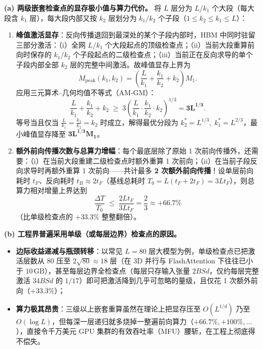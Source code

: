 \textbf{(a) 两级嵌套检查点的显存极小值与算力代价。} 将 $L$ 层分为 $L / k_1$ 个大段（每大段含 $k_1$ 层），每大段内部又按 $k_2$ 层划分为 $k_1 / k_2$ 个子段（$1 \le k_2 \le k_1 \le L$）：
\begin{enumerate}
  \item \textbf{峰值激活显存}：反向传播退回到最深处的某个子段内部时，HBM 中同时驻留三部分激活：（i）全网 $L / k_1$ 个大段起点的顶级检查点；（ii）当前大段重算前向时保存的 $k_1 / k_2$ 个子段起点的二级检查点；（iii）当前正在反向求导的单个子段内部全部 $k_2$ 层的完整中间激活。故峰值显存上界为
  \[
    M_{\mathrm{peak}}(k_1, k_2) = \left(\frac{L}{k_1} + \frac{k_1}{k_2} + k_2\right) M_1.
  \]
  应用三元算术--几何均值不等式（AM-GM）：
  \[
    \frac{L}{k_1} + \frac{k_1}{k_2} + k_2 \;\ge\; 3\left(\frac{L}{k_1} \cdot \frac{k_1}{k_2} \cdot k_2\right)^{1/3} = \mathbf{3 L^{1/3}}.
  \]
  等号当且仅当 $\frac{L}{k_1} = \frac{k_1}{k_2} = k_2$ 时成立，解得最优分段为 $k_2^* = L^{1/3},\; k_1^* = L^{2/3}$，最小峰值显存降至 $\mathbf{3 L^{1/3} M_1}$。
  \item \textbf{额外前向传播次数与总算力增幅}：每个最底层除了原始 1 次前向传播外，还需要：（i）在当前大段重建二级检查点时额外重算 1 次前向；（ii）在当前子段反向求导时再额外重算 1 次前向——共计最多 \textbf{2 次额外前向传播}！设单层前向耗时 $t_F$、反向耗时 $t_B \approx 2 t_F$（基线总耗时 $T_0 = L(t_F + 2 t_F) = 3 L t_F$），则总算力相对增量上界达到
  \[
    \frac{\Delta T}{T_0} \;\le\; \frac{2 L t_F}{3 L t_F} = \frac{2}{3} \approx \mathbf{+66.7\%}
  \]
  （比单级检查点的 $+33.3\%$ 整整翻倍）。
\end{enumerate}

\textbf{(b) 工程界普遍采用单级（或每层边界）检查点的原因。}
\begin{itemize}
  \item \textbf{边际收益递减与瓶颈转移}：以常见 $L = 80$ 层大模型为例，单级检查点已把激活层数从 $80$ 压至 $2\sqrt{80} \approx 18$ 层（在 3D 并行与 FlashAttention 下往往已小于 $10\,\mathrm{GB}$），甚至每层边界全检查点（每层只存输入张量 $2 B S d$，仅约每层完整激活 $34 B S d$ 的 $1/17$）即可把激活降到几乎可忽略的量级，且仅花 1 次额外前向（$+33.3\%$）；
  \item \textbf{算力极其昂贵}：三级以上嵌套重算虽然在理论上把显存压至 $O(L^{1/d})$ 乃至 $O(\log L)$，但每深一层递归就多烧掉一整遍前向算力（$+66.7\%, +100\%, \dots$），直接令千万美元 GPU 集群的有效吞吐率（MFU）腰斩，在工程上彻底得不偿失。
\end{itemize}


